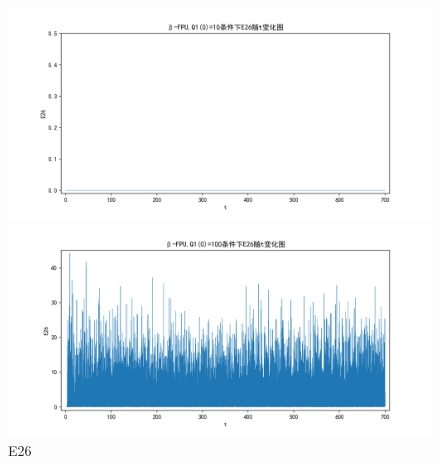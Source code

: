 \documentclass[10pt, a4paper]{article}
\begin{document}
    \begin{figure}[H]
        \begin{minipage}[t]{0.49\textwidth}
            \centering
            \includegraphics[width=\textwidth]{./q6_pics/cmp/E26.png}
        \end{minipage}
        \begin{minipage}[t]{0.49\textwidth}
            \centering
            \includegraphics[width=\textwidth]{./q6_pics/exp/E26.png}
        \end{minipage}
        \caption{E26}\label{fig:E26 in q6}
    \end{figure}
\end{document}
